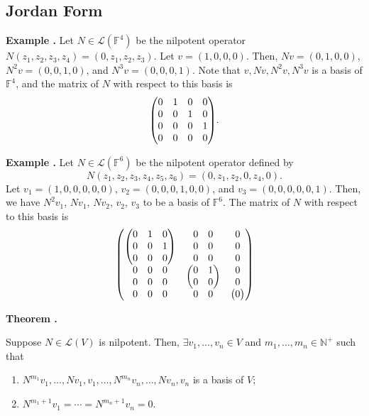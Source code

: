 \documentclass[11pt, letterpaper]{article}
\newcounter{index}[subsection]
\newenvironment*{eg}{\begin{framed}\par\noindent\textbf{Example \thesubsection.\stepcounter{index}\theindex}}{\par\end{framed}}
\newenvironment*{thm}[1]{\begin{tcolorbox}\par\noindent\textbf{Theorem \thesubsection.\stepcounter{index}\theindex\ #1} \par}{\par\end{tcolorbox}}
\def\N{\mathbb{N}}
\def\F{\mathbb{F}}
\def\L{\mathcal{L}}
\begin{document}
\subsection{Jordan Form}
\begin{eg}
	Let $N\in\L(\F^4)$ be the nilpotent operator $N(z_1,z_2,z_3,z_4)=(0,z_1,z_2,z_3)$. Let $v=(1,0,0,0)$. Then, $Nv=(0,1,0,0)$, $N^2v=(0,0,1,0)$, and $N^3v=(0,0,0,1)$. Note that $v, Nv, N^2v, N^3v$ is a basis of $\F^4$, and the matrix of $N$ with respect to this basis is \[\mqty(0&1&0&0\\0&0&1&0\\0&0&0&1\\0&0&0&0).\]	
\end{eg}
\begin{eg}
	Let $N\in\L(\F^6)$ be the nilpotent operator defined by \[N(z_1,z_2,z_3,z_4,z_5,z_6)=(0,z_1,z_2,0,z_4,0).\] Let $v_1=(1,0,0,0,0,0)$, $v_2=(0,0,0,1,0,0)$, and $v_3=(0,0,0,0,0,1)$. Then, we have $N^2v_1$, $Nv_1$, $Nv_2$, $v_2$, $v_3$ to be a basis of $\F^6$. The matrix of $N$ with respect to this basis is \[\mqty(\mqty(0&1&0\\0&0&1\\0&0&0)&\begin{array}{cc}0&0\\0&0\\0&0\end{array}&\begin{array}{c}0\\0\\0\end{array}\\\begin{array}{ccc}0&0&0\\0&0&0\end{array}&\mqty(0&1\\0&0)&\begin{array}{c}0\\0\\\end{array}\\\begin{array}{ccc}0&0&0\end{array}&\begin{array}{cc}0&0\end{array}&\mqty(0))\]
\end{eg}
\begin{thm}{}
	Suppose $N\in\L(V)$ is nilpotent. Then, $\exists v_1,\dots,v_n\in V$ and $m_1,\dots,m_n\in\N^+$ such that 
	\begin{enumerate}
		\item $N^{m_1}v_1,\dots,Nv_1,v_1,\dots,N^{m_n}v_n,\dots,Nv_n,v_n$ is a basis of $V$;
		\item $N^{m_1+1}v_1=\cdots=N^{m_n+1}v_n=0$.
	\end{enumerate}
\end{thm}
\end{document}
